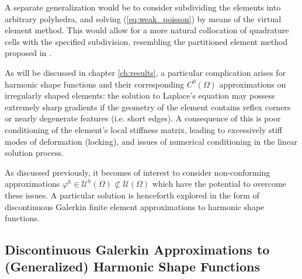 	A separate generalization would be to consider subdividing the elements into arbitrary polyhedra, and solving (\ref{eq:weak_poisson}) by means of the virtual element method. This would allow for a more natural collocation of quadrature cells with the specified subdivision, resembling the partitioned element method proposed in \cite{Rashid:12}.
	
	As will be discussed in chapter \ref{ch:results}, a particular complication arises for harmonic shape functions and their corresponding $C^0 (\Omega)$ approximations on irregularly shaped elements: the solution to Laplace's equation may possess extremely sharp gradients if the geometry of the element contains reflex corners or nearly degenerate features (i.e. short edges). A consequence of this is poor conditioning of the element's local stiffness matrix, leading to excessively stiff modes of deformation (locking), and issues of numerical conditioning in the linear solution process.
	
	As discussed previously, it becomes of interest to consider non-conforming approximations $\varphi^h \in \mathcal{U}^h (\Omega) \not\subset \mathcal{U} (\Omega)$ which have the potential to overcome these issues. A particular solution is henceforth explored in the form of discontinuous Galerkin finite element approximations to harmonic shape functions.

\subsection*{Discontinuous Galerkin Approximations to \\ (Generalized) Harmonic Shape Functions}

